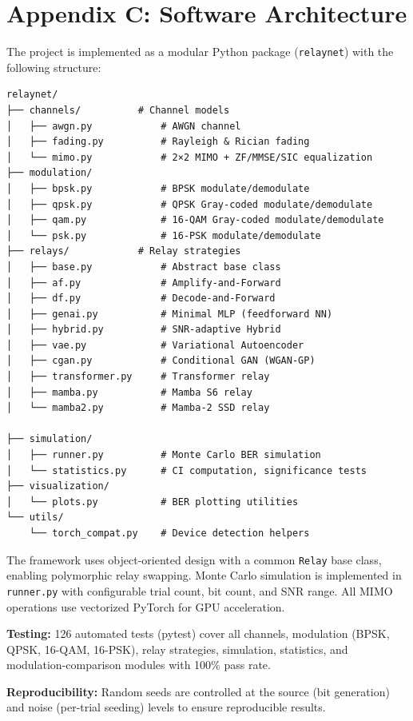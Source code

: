 \section{Appendix C: Software Architecture}\label{sec:appendix-c-software-architecture}

The project is implemented as a modular Python package (\texttt{relaynet}) with the following structure:

\begin{verbatim}
relaynet/
├── channels/          # Channel models
│   ├── awgn.py            # AWGN channel
│   ├── fading.py          # Rayleigh & Rician fading
│   └── mimo.py            # 2×2 MIMO + ZF/MMSE/SIC equalization
├── modulation/
│   ├── bpsk.py            # BPSK modulate/demodulate
│   ├── qpsk.py            # QPSK Gray-coded modulate/demodulate
│   ├── qam.py             # 16-QAM Gray-coded modulate/demodulate
│   └── psk.py             # 16-PSK modulate/demodulate
├── relays/            # Relay strategies
│   ├── base.py            # Abstract base class
│   ├── af.py              # Amplify-and-Forward
│   ├── df.py              # Decode-and-Forward
│   ├── genai.py           # Minimal MLP (feedforward NN)
│   ├── hybrid.py          # SNR-adaptive Hybrid
│   ├── vae.py             # Variational Autoencoder
│   ├── cgan.py            # Conditional GAN (WGAN-GP)
│   ├── transformer.py     # Transformer relay
│   ├── mamba.py           # Mamba S6 relay
│   └── mamba2.py          # Mamba-2 SSD relay

├── simulation/
│   ├── runner.py          # Monte Carlo BER simulation
│   └── statistics.py      # CI computation, significance tests
├── visualization/
│   └── plots.py           # BER plotting utilities
└── utils/
    └── torch_compat.py    # Device detection helpers
\end{verbatim}

The framework uses object-oriented design with a common \texttt{Relay} base class, enabling polymorphic relay swapping. Monte Carlo simulation is implemented in \texttt{runner.py} with configurable trial count, bit count, and SNR range. All MIMO operations use vectorized PyTorch for GPU acceleration.

\textbf{Testing:} 126 automated tests (pytest) cover all channels, modulation (BPSK, QPSK, 16-QAM, 16-PSK), relay strategies, simulation, statistics, and modulation-comparison modules with 100\% pass rate.

\textbf{Reproducibility:} Random seeds are controlled at the source (bit generation) and noise (per-trial seeding) levels to ensure reproducible results.

